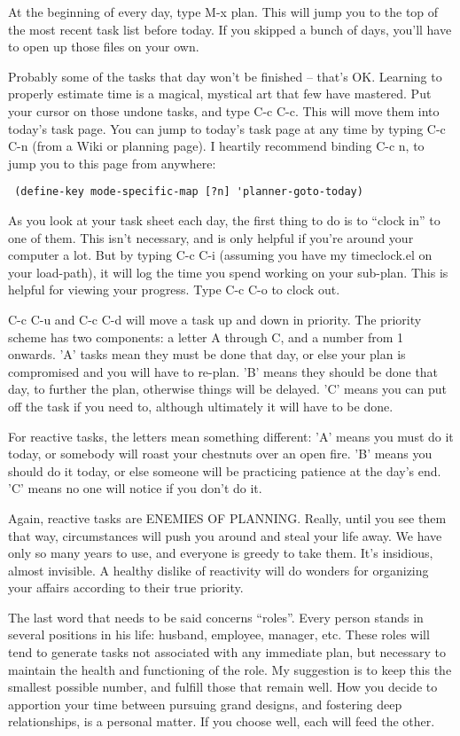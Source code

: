 \documentclass[12pt,a4paper,onecolumn]{article}
\begin{document}
\begin{sffamily}
At the beginning of every day, type M-x plan. This will jump you to the top of the most recent task
list before today. If you skipped a bunch of days, you'll have to open up those files on your own.

Probably some of the tasks that day won't be finished -- that's OK. Learning to properly estimate
time is a magical, mystical art that few have mastered. Put your cursor on those undone tasks, and
type C-c C-c. This will move them into today's task page. You can jump to today's task page at any
time by typing C-c C-n (from a Wiki or planning page). I heartily recommend binding C-c n, to jump
you to this page from anywhere:

\begin{lstlisting} (define-key mode-specific-map [?n] 'planner-goto-today)
\end{lstlisting}


As you look at your task sheet each day, the first thing to do is to ``clock in'' to one of them.
This isn't necessary, and is only helpful if you're around your computer a lot. But by typing C-c
C-i (assuming you have my timeclock.el on your load-path), it will log the time you spend working on
your sub-plan. This is helpful for viewing your progress. Type C-c C-o to clock out.

C-c C-u and C-c C-d will move a task up and down in priority. The priority scheme has two
components: a letter A through C, and a number from 1 onwards. 'A' tasks mean they must be done that
day, or else your plan is compromised and you will have to re-plan. 'B' means they should be done
that day, to further the plan, otherwise things will be delayed. 'C' means you can put off the task
if you need to, although ultimately it will have to be done.

For reactive tasks, the letters mean something different: 'A' means you must do it today, or
somebody will roast your chestnuts over an open fire. 'B' means you should do it today, or else
someone will be practicing patience at the day's end. 'C' means no one will notice if you don't do
it.

Again, reactive tasks are ENEMIES OF PLANNING. Really, until you see them that way, circumstances
will push you around and steal your life away. We have only so many years to use, and everyone is
greedy to take them. It's insidious, almost invisible. A healthy dislike of reactivity will do
wonders for organizing your affairs according to their true priority.

The last word that needs to be said concerns ``roles''. Every person stands in several positions in
his life: husband, employee, manager, etc. These roles will tend to generate tasks not associated
with any immediate plan, but necessary to maintain the health and functioning of the role. My
suggestion is to keep this the smallest possible number, and fulfill those that remain well. How you
decide to apportion your time between pursuing grand designs, and fostering deep relationships, is a
personal matter. If you choose well, each will feed the other.


\end{sffamily}
\end{document}

